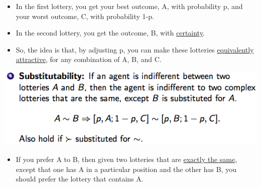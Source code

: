 \documentclass[12pt]{article}
\begin{document}
\begin{tcolorbox}
\begin{itemize}
\item  In the first lottery, you get your best outcome, A, with probability p, and your worst outcome, C, with probability 1-p. 
\item In the second lottery, you get the outcome, B, with \underline{certainty}.
\item So, the idea is that, by adjusting p, you can make these lotteries \underline{equivalently attractive}, for any combination of A, B, and C.
\end{itemize}

\includegraphics[scale=0.5]{p4}\\
\begin{itemize}
\item  If you prefer A to B, then given two lotteries that are \underline{exactly the same}, except that one has A in a particular position and the other has B, you should prefer the lottery that contains A.
\end{itemize}
\end{tcolorbox}
\end{document}
